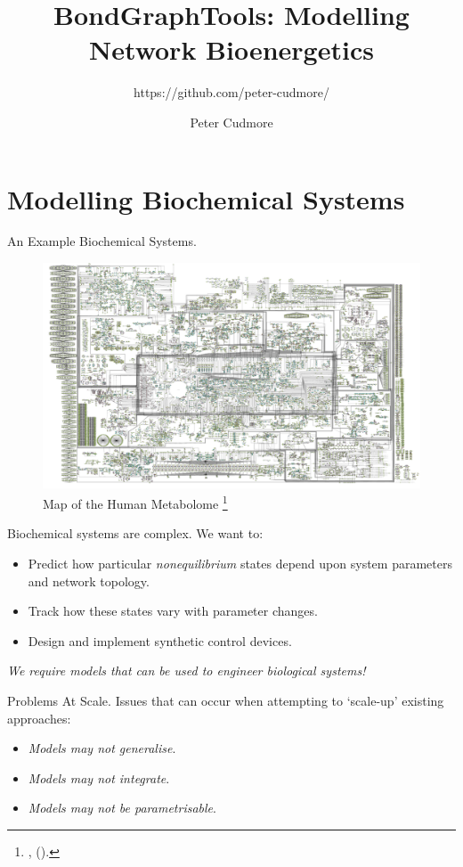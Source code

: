 \documentclass[11pt,reqno]{beamer}
\title{BondGraphTools: Modelling Network Bioenergetics}
\author{Peter Cudmore}
\subtitle{https://github.com/peter-cudmore/}
\date{}
\newcommand{\fcite}[1]{
\footnote{\cite{#1}, (\citeyear{#1}).}
}
\begin{document}
\begin{frame}
\titlepage
\addtocounter{framenumber}{-1} 
\end{frame}
\section{Modelling Biochemical Systems}
\begin{frame}{An Example Biochemical Systems.}
\begin{figure}
\includegraphics[width=0.8\linewidth]{map.png}
\caption{Map of the Human Metabolome\fcite{HMDB}}
\end{figure}
\end{frame}

\begin{frame}{Biochemical systems are complex.}
We want to:
\begin{itemize}
	\item Predict how particular \emph{nonequilibrium} states depend upon system parameters and network topology.
	\item Track how these states vary with parameter changes.
	\item Design and implement synthetic control devices.
\end{itemize}
\vspace{20pt}

\emph{We require models that can be used to engineer biological systems!}
\end{frame}

\begin{frame}{Problems At Scale.}
Issues that can occur when attempting to `scale-up' existing approaches:
\begin{itemize}
	\item<2-> \emph{Models may not generalise}.
	\item<3-> \emph{Models may not integrate}.
	\item<4-> \emph{Models may not be parametrisable}.
\end{itemize}
\vfill
{}
\end{frame}
\end{document}
